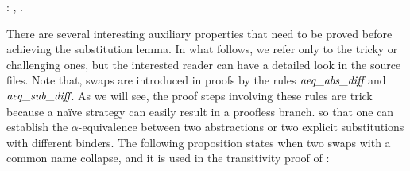 \begin{coqdoccode}
\coqdocemptyline
\coqdocnoindent
{} : \coqdockw{\ensuremath{\forall}}    ,             .\coqdoceol
\coqdocemptyline
\coqdocemptyline
\end{coqdoccode}
There are several interesting auxiliary properties that need to be proved before achieving the substitution lemma. In what follows, we refer only to the tricky or challenging ones, but the interested reader can have a detailed look in the source files. Note that, swaps are introduced in proofs by the rules $\mbox{\it aeq}\_\mbox{\it abs}\_\mbox{\it diff}$ and $\mbox{\it aeq}\_\mbox{\it sub}\_\mbox{\it diff}$. As we will see, the proof steps involving these rules are trick because a naïve strategy can easily result in a proofless branch. so that one can establish the $\alpha$-equivalence between two abstractions or two explicit substitutions with different binders. The following proposition states when two swaps with a common name collapse, and it is used in the transitivity proof of : 
